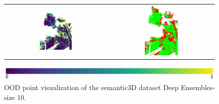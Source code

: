 \begin{figure}[h!]
\begin{tabular}{cc}
                \includegraphics[width=0.33\textwidth, height=0.18\textheight]{images/ood_imgs/fout_sem3d/fout_ent_3.png}& 
                \includegraphics[width=0.33\textwidth, height=0.18\textheight]{images/ood_imgs/fout_sem3d/fout_ent_ood_auroc_3.png}\\
            \end{tabular}
            \includegraphics[scale=0.45]{images/prob_legend.pdf}
            \caption{OOD point visualization of the semantic3D dataset Deep Ensembles-size 10.}
            \label{fig:fout_ood_auroc_sem3d_ent}
        \end{figure}

